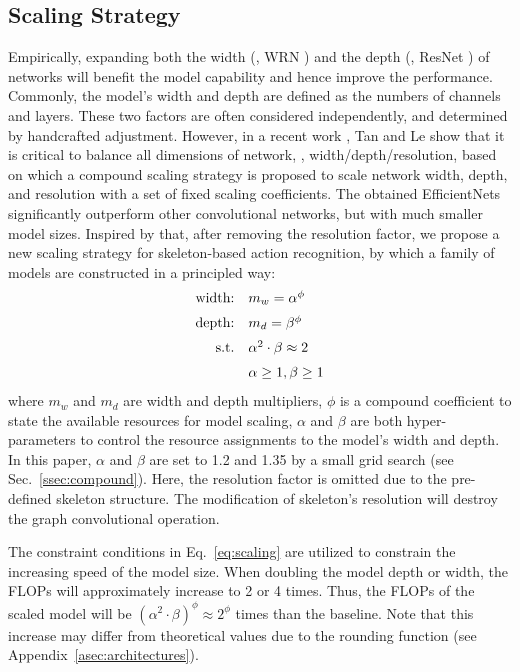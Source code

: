 \documentclass[10pt,journal,compsoc]{IEEEtran}
\begin{document}
\subsection{Scaling Strategy}
\label{ssec:scaling}

Empirically, expanding both the width (\eg, WRN \cite{zagoruyko2016wide}) and the depth (\eg, ResNet \cite{he2016deep}) of networks will benefit the model capability and hence improve the performance. Commonly, the model's width and depth are defined as the numbers of channels and layers. These two factors are often considered independently, and determined by handcrafted adjustment. However, in a recent work \etal \cite{tan2019efficientnet}, Tan and Le show that it is critical to balance all dimensions of network, \eg, width/depth/resolution, based on which a compound scaling strategy is proposed to scale network width, depth, and resolution with a set of fixed scaling coefficients. The obtained EfficientNets significantly outperform other convolutional networks, but with much smaller model sizes. Inspired by that, after removing the resolution factor, we propose a new scaling strategy for skeleton-based action recognition, by which a family of models are constructed in a principled way:
\begin{equation}\label{eq:scaling}
  \begin{array}{rl}
    \vspace{0.2cm}
    \text{width:} & m_w=\alpha^\phi \\
    \vspace{0.2cm}
    \text{depth:} & m_d=\beta^\phi \\
    \vspace{0.2cm}
    \text{s.t.}   & \alpha^2\cdot\beta\approx 2 \\
                  & \alpha\geq1,\beta\geq1 \\
  \end{array}
\end{equation}
where $m_w$ and $m_d$ are width and depth multipliers, $\phi$ is a compound coefficient to state the available resources for model scaling, $\alpha$ and $\beta$ are both hyper-parameters to control the resource assignments to the model's width and depth. In this paper, $\alpha$ and $\beta$ are set to 1.2 and 1.35 by a small grid search (see Sec.~\ref{ssec:compound}). Here, the resolution factor is omitted due to the pre-defined skeleton structure. The modification of skeleton's resolution will destroy the graph convolutional operation.

The constraint conditions in Eq.~\ref{eq:scaling} are utilized to constrain the increasing speed of the model size. When doubling the model depth or width, the FLOPs will approximately increase to 2 or 4 times. Thus, the FLOPs of the scaled model will be $(\alpha^2\cdot\beta)^\phi \approx 2^\phi$ times than the baseline. Note that this increase may differ from theoretical values due to the rounding function (see Appendix~\ref{asec:architectures}).
\end{document}

